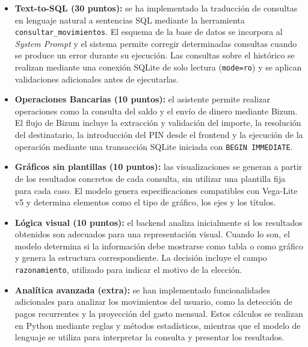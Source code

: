 \begin{itemize}

    \item \textbf{Text-to-SQL (30 puntos):} se ha implementado la traducción de
    consultas en lenguaje natural a sentencias SQL mediante la herramienta
    \texttt{consultar\_movimientos}. El esquema de la base de datos se incorpora
    al \textit{System Prompt} y el sistema permite corregir determinadas
    consultas cuando se produce un error durante su ejecución. Las consultas
    sobre el histórico se realizan mediante una conexión SQLite de solo lectura
    (\texttt{mode=ro}) y se aplican validaciones adicionales antes de ejecutarlas.

    \item \textbf{Operaciones Bancarias (10 puntos):} el asistente permite
    realizar operaciones como la consulta del saldo y el envío de dinero
    mediante Bizum. El flujo de Bizum incluye la extracción y validación del
    importe, la resolución del destinatario, la introducción del PIN desde el
    frontend y la ejecución de la operación mediante una transacción SQLite
    iniciada con \texttt{BEGIN IMMEDIATE}.

    \item \textbf{Gráficos sin plantillas (10 puntos):} las visualizaciones se
    generan a partir de los resultados concretos de cada consulta, sin utilizar
    una plantilla fija para cada caso. El modelo genera especificaciones
    compatibles con Vega-Lite v5 y determina elementos como el tipo de gráfico,
    los ejes y los títulos.

    \item \textbf{Lógica visual (10 puntos):} el backend analiza inicialmente
    si los resultados obtenidos son adecuados para una representación visual.
    Cuando lo son, el modelo determina si la información debe mostrarse como
    tabla o como gráfico y genera la estructura correspondiente. La decisión
    incluye el campo \texttt{razonamiento}, utilizado para indicar el motivo de
    la elección.

    \item \textbf{Analítica avanzada (extra):} se han implementado
    funcionalidades adicionales para analizar los movimientos del usuario,
    como la detección de pagos recurrentes y la proyección del gasto mensual.
    Estos cálculos se realizan en Python mediante reglas y métodos estadísticos,
    mientras que el modelo de lenguaje se utiliza para interpretar la consulta
    y presentar los resultados.

\end{itemize}